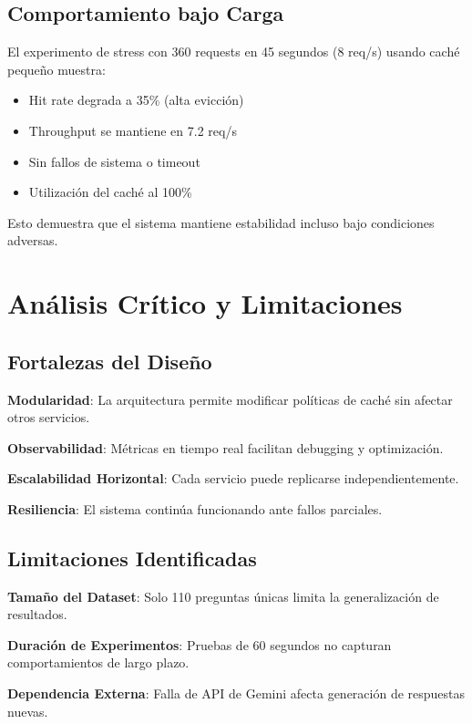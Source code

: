 \documentclass[12pt,a4paper]{article}
\begin{document}
\subsection{Comportamiento bajo Carga}

El experimento de stress con 360 requests en 45 segundos (8 req/s) usando caché pequeño muestra:

\begin{itemize}
\item Hit rate degrada a 35\% (alta evicción)
\item Throughput se mantiene en 7.2 req/s
\item Sin fallos de sistema o timeout
\item Utilización del caché al 100\%
\end{itemize}

Esto demuestra que el sistema mantiene estabilidad incluso bajo condiciones adversas.

\section{Análisis Crítico y Limitaciones}

\subsection{Fortalezas del Diseño}

\textbf{Modularidad}: La arquitectura permite modificar políticas de caché sin afectar otros servicios.

\textbf{Observabilidad}: Métricas en tiempo real facilitan debugging y optimización.

\textbf{Escalabilidad Horizontal}: Cada servicio puede replicarse independientemente.

\textbf{Resiliencia}: El sistema continúa funcionando ante fallos parciales.

\subsection{Limitaciones Identificadas}

\textbf{Tamaño del Dataset}: Solo 110 preguntas únicas limita la generalización de resultados.

\textbf{Duración de Experimentos}: Pruebas de 60 segundos no capturan comportamientos de largo plazo.

\textbf{Dependencia Externa}: Falla de API de Gemini afecta generación de respuestas nuevas.
\end{document}

